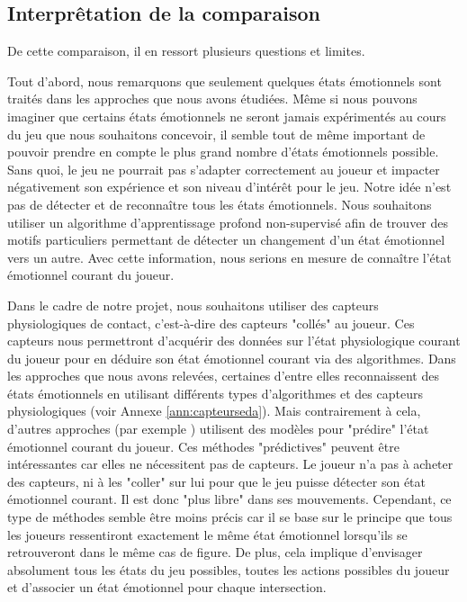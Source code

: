 \documentclass[11pt]{article}
\begin{document}
	\subsection{Interprêtation de la comparaison}
        De cette comparaison, il en ressort plusieurs questions et limites.\par
		Tout d'abord, nous remarquons que seulement quelques états émotionnels sont traités dans les approches que nous avons étudiées.
		Même si nous pouvons imaginer que certains états émotionnels ne seront jamais expérimentés au cours du jeu que nous souhaitons concevoir, il semble tout de même important de pouvoir prendre en compte le plus grand nombre d'états émotionnels possible.
		Sans quoi, le jeu ne pourrait pas s'adapter correctement au joueur et impacter négativement son expérience et son niveau d'intérêt pour le jeu.
		Notre idée n'est pas de détecter et de reconnaître tous les états émotionnels.
		Nous souhaitons utiliser un algorithme d'apprentissage profond non-supervisé afin de trouver des motifs particuliers permettant de détecter un changement d'un état émotionnel vers un autre.
		Avec cette information, nous serions en mesure de connaître l'état émotionnel courant du joueur.\par
		Dans le cadre de notre projet, nous souhaitons utiliser des capteurs physiologiques de contact, c'est-à-dire des capteurs "collés" au joueur.
		Ces capteurs nous permettront d'acquérir des données sur l'état physiologique courant du joueur pour en déduire son état émotionnel courant via des algorithmes.
		Dans les approches que nous avons relevées, certaines d'entre elles reconnaissent des états émotionnels en utilisant différents types d'algorithmes et des capteurs physiologiques (voir Annexe \ref{ann:capteurseda}).
		Mais contrairement à cela, d'autres approches (par exemple \cite{Mostefai_et_al._2019}) utilisent des modèles pour "prédire" l'état émotionnel courant du joueur.
		Ces méthodes "prédictives" peuvent être intéressantes car elles ne nécessitent pas de capteurs.
		Le joueur n'a pas à acheter des capteurs, ni à les "coller" sur lui pour que le jeu puisse détecter son état émotionnel courant.
		Il est donc "plus libre" dans ses mouvements.
		Cependant, ce type de méthodes semble être moins précis car il se base sur le principe que tous les joueurs ressentiront exactement le même état émotionnel lorsqu'ils se retrouveront dans le même cas de figure.
		De plus, cela implique d'envisager absolument tous les états du jeu possibles, toutes les actions possibles du joueur et d'associer un état émotionnel pour chaque intersection.
\end{document}
